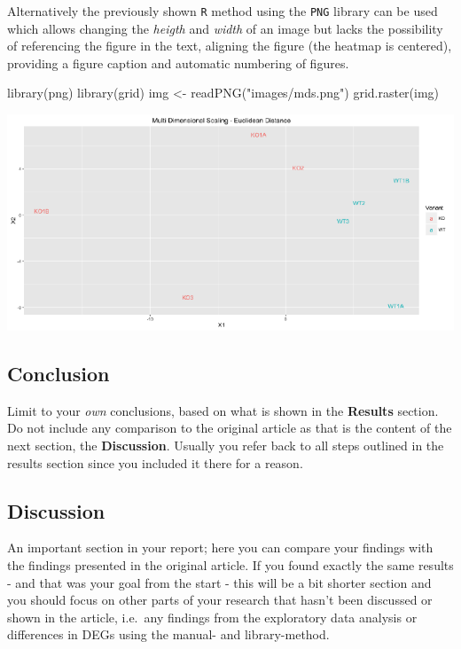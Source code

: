 \newpage

Alternatively the previously shown \texttt{R} method using the
\texttt{PNG} library can be used which allows changing the \emph{heigth}
and \emph{width} of an image but lacks the possibility of referencing
the figure in the text, aligning the figure (the heatmap is centered),
providing a figure caption and automatic numbering of figures.

\begin{Schunk}
\begin{Sinput}
library(png)
library(grid)
img <- readPNG("images/mds.png")
grid.raster(img)
\end{Sinput}

\includegraphics{artikel_files/figure-latex/MDS-Figure-1} \end{Schunk}

\hypertarget{conclusion}{%
\subsection{Conclusion}\label{conclusion}}

Limit to your \emph{own} conclusions, based on what is shown in the
\textbf{Results} section. Do not include any comparison to the original
article as that is the content of the next section, the
\textbf{Discussion}. Usually you refer back to all steps outlined in the
results section since you included it there for a reason.

\hypertarget{discussion}{%
\subsection{Discussion}\label{discussion}}

An important section in your report; here you can compare your findings
with the findings presented in the original article. If you found
exactly the same results - and that was your goal from the start - this
will be a bit shorter section and you should focus on other parts of
your research that hasn't been discussed or shown in the article,
i.e.~any findings from the exploratory data analysis or differences in
DEGs using the manual- and library-method.

